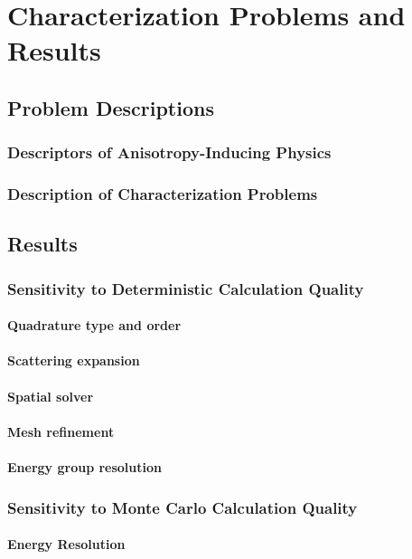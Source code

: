 \chapter{Characterization Problems and Results}

\section{Problem Descriptions}
\subsection{Descriptors of Anisotropy-Inducing Physics}
\subsection{Description of Characterization Problems}
\section{Results}
\subsection{Sensitivity to Deterministic Calculation Quality}
\subsubsection{Quadrature type and order}
\subsubsection{Scattering expansion}
\subsubsection{Spatial solver}
\subsubsection{Mesh refinement}
\subsubsection{Energy group resolution}
\subsection{Sensitivity to Monte Carlo Calculation Quality}
\subsubsection{Energy Resolution}

